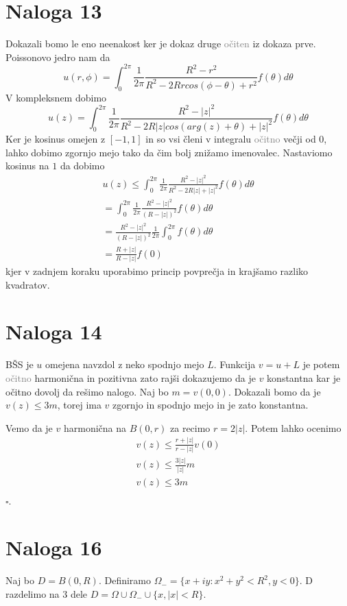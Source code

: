 \documentclass[12pt]{article}
\begin{document}
\section{Naloga 13}
Dokazali bomo le eno neenakost ker je dokaz druge \textcolor{gray}{očiten} iz dokaza prve.
Poissonovo jedro nam da 
\[ u(r, \phi) = \int_0^{2\pi} \frac{1}{2\pi} \frac{R^2-r^2}{R^2-2Rrcos(\phi-\theta)+r^2}f(\theta)d\theta\]
V kompleksnem dobimo
\[ u(z) = \int_0^{2\pi} \frac{1}{2\pi} \frac{R^2-|z|^2}{R^2-2R|z|cos(arg(z)+\theta)+|z|^2}f(\theta)d\theta\]
Ker je kosinus omejen z $[-1,1]$  in so vsi členi v integralu \textcolor{gray}{očitno} večji od 0, lahko dobimo zgornjo mejo tako da čim bolj znižamo imenovalec. Nastaviomo kosinus na $1$ da dobimo
\begin{align*}
u(z) \le \int_0^{2\pi} \frac{1}{2\pi} \frac{R^2-|z|^2}{R^2-2R|z|+|z|^2}f(\theta)d\theta \\
= \int_0^{2\pi} \frac{1}{2\pi} \frac{R^2-|z|^2}{(R-|z|)^2}f(\theta)d\theta \\
= \frac{R^2-|z|^2}{(R-|z|)^2} \frac{1}{2\pi} \int_0^{2\pi} f(\theta)d\theta \\
= \frac{R+|z|}{R-|z|} f(0)
\end{align*}
kjer v zadnjem koraku uporabimo princip povprečja in krajšamo razliko kvadratov.

\section{Naloga 14}
BŠS je $u$ omejena navzdol z neko spodnjo mejo $L$. Funkcija $v=u+L$ je potem \textcolor{gray}{očitno} harmonična in pozitivna zato rajši dokazujemo da je $v$ konstantna kar je očitno dovolj 
da rešimo nalogo. Naj bo $m=v(0,0)$. Dokazali bomo da je $v(z)\leq 3m$, torej ima $v$ zgornjo in spodnjo mejo in je zato konstantna.

Vemo da je $v$ harmonična na $B(0, r)$ za recimo $r=2|z|$. Potem lahko ocenimo 
\begin{align*}
    v(z) \le \frac{r+|z|}{r-|z|}v(0)\\
    v(z) \le \frac{3|z|}{|z|}m\\
    v(z) \le 3m\\
\end{align*}
$\square$.
\section{Naloga 16}
Naj bo $D = B(0, R)$. Definiramo $\Omega_- = \{x+iy: x^2+y^2<R^2, y<0\}$. D razdelimo na 3 dele $D=\Omega \cup \Omega_- \cup \{x, |x|<R\}$.
\end{document}
